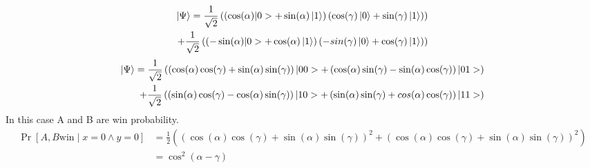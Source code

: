 \begin{equation*}
\begin{aligned}
\ket{\Psi }= \frac{1}{\sqrt{2}}\left( \left(\cos(\alpha)|0>+\sin(\alpha)\ket{1} \right) \left(\cos(\gamma)\ket{0}+\sin(\gamma)\ket{1} \right) \right)  \\  
+  \frac{1}{\sqrt{2}} \left( \left(-\sin(\alpha)|0>+\cos(\alpha)\ket{1} \right) \left(-sin(\gamma)\ket{0}+\cos(\gamma)\ket{1} \right) \right)
\end{aligned}
\end{equation*}
\begin{equation*}
\begin{aligned}
\ket{\Psi} = \frac{1}{\sqrt{2}}\left(\left(\cos(\alpha) \cos(\gamma)+\sin(\alpha) \sin(\gamma)\right)|00>+\left( \cos(\alpha)  \sin(\gamma)-\sin(\alpha)  \cos(\gamma)\right)|01>\right)\\
+\frac{1}{\sqrt{2}}\left( \left( \sin(\alpha)  \cos(\gamma)-\cos(\alpha) \sin(\gamma)\right)|10>+\left(\sin(\alpha)  \sin(\gamma)+cos(\alpha)  \cos(\gamma)\right)|11>\right)
\end{aligned}
\end{equation*}
In this case A and B are win probability.
\begin{align}
 \Pr[A,B \text{win}  \mid  x=0 \wedge y=0]&=\frac{1}{2}\left(\left(\cos(\alpha) \cos(\gamma)+\sin(\alpha)\sin(\gamma)\right)^2   +\left(\cos(\alpha) \cos(\gamma)+\sin(\alpha)\sin(\gamma)\right)^2  \right)\nonumber\\ 
&=\cos^2(\alpha-\gamma)\label{eq2}
\end{align}

